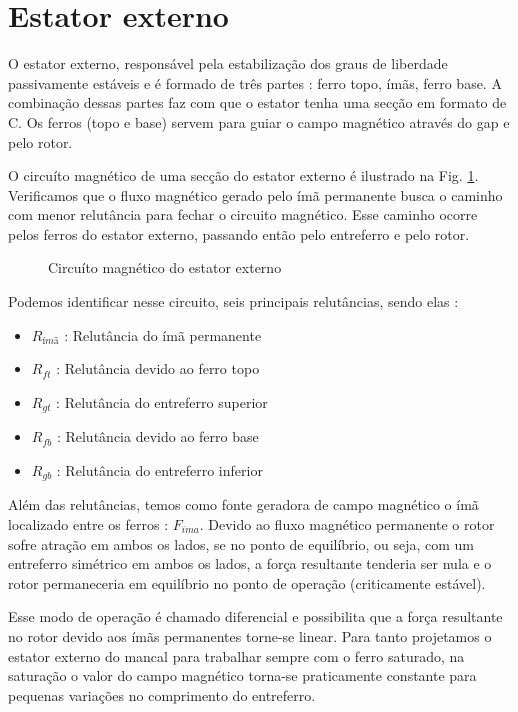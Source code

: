 \section{Estator externo}\label{cap:mancal:estator:externo}

O estator externo, responsável pela estabilização dos graus de liberdade passivamente estáveis e é formado de três partes : ferro topo, ímãs, ferro base. A combinação dessas partes faz com que o estator tenha uma secção em formato de C. Os ferros (topo e base) servem para guiar o campo magnético através do gap e pelo rotor. 

O circuíto magnético de uma secção do estator externo é ilustrado na Fig. \ref{Fig:mancal:circuito:passivo}. Verificamos que o fluxo magnético gerado pelo ímã permanente busca o caminho com menor relutância para fechar o circuito magnético. Esse caminho ocorre pelos ferros do estator externo, passando então pelo entreferro e  pelo rotor.

\begin{figure}[!ht]
	\centering
	\def\svgwidth{1\columnwidth}
	
	\caption{Circuíto magnético do estator externo}
	\label{Fig:mancal:circuito:passivo}
\end{figure}

Podemos identificar nesse circuito, seis principais relutâncias, sendo elas :

\begin{itemize}
	\item $R_{ímã}$ : Relutância do ímã permanente
	\item $R_{ft}$ : Relutância devido ao ferro topo
	\item $R_{gt}$ : Relutância do entreferro superior
	\item $R_{fb}$ : Relutância devido ao ferro base
	\item $R_{gb}$ : Relutância do entreferro inferior	
\end{itemize}

Além das relutâncias, temos como fonte geradora de campo magnético o ímã localizado entre os ferros : $F_{ima}$. Devido ao fluxo magnético permanente o rotor sofre atração em ambos os lados, se no ponto de equilíbrio, ou seja, com um entreferro simétrico em ambos os lados, a força resultante tenderia ser nula e o rotor permaneceria em equilíbrio no ponto de operação (criticamente estável). 

Esse modo de operação é chamado diferencial e possibilita que a força resultante no rotor devido aos ímãs permanentes torne-se linear. Para tanto projetamos o estator externo do mancal para trabalhar sempre com o ferro saturado, na saturação o valor do campo magnético torna-se praticamente constante para pequenas variações no comprimento do entreferro.

